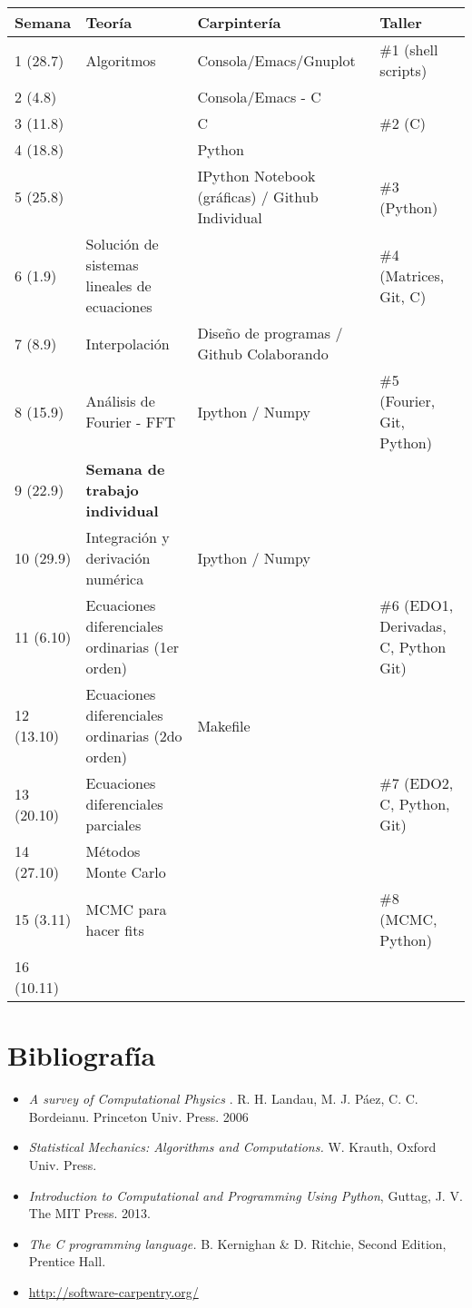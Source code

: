 \documentclass[11pt]{article}
\begin{document}
\begin{center}
\begin{tabular}{|p{1.8cm}|p{6cm}|p{4.0cm}|p{4.5cm}|}
\hline
Semana & Teor\'ia & Carpinter\'ia & Taller \\\hline
1 (28.7) & Algoritmos	&Consola/Emacs/Gnuplot & \#1 (shell scripts)\\\hline
2 (4.8)& 	& Consola/Emacs - C  & \\\hline
3 (11.8)& 	&C  & \#2 (C)\\\hline
4 (18.8)& 	&Python &  \\\hline
5 (25.8)& 	&IPython Notebook (gr\'aficas) / Github Individual & \#3
(Python) \\\hline
6 (1.9)&      Soluci\'on de sistemas lineales de ecuaciones &  & \#4
(Matrices, Git, C)\\\hline
7 (8.9)&  Interpolaci\'on & Dise\~no de programas / Github Colaborando & \\ \hline
8 (15.9)& An\'alisis de Fourier - FFT &  Ipython / Numpy& \#5 (Fourier, Git, Python)\\\hline
9 (22.9) & {\bf Semana de trabajo individual} & &\\\hline 
10 (29.9) & Integraci\'on y derivaci\'on num\'erica & Ipython / Numpy & \\\hline
11 (6.10) & Ecuaciones diferenciales ordinarias (1er orden)& &  \#6
(EDO1, Derivadas, C, Python Git)\\\hline
12 (13.10)& Ecuaciones diferenciales ordinarias (2do orden)&  Makefile &   \\\hline 
13 (20.10) & Ecuaciones diferenciales parciales & & \#7 (EDO2, C, Python, Git)\\\hline
14 (27.10) & M\'etodos Monte Carlo &   & \\\hline
15 (3.11) & MCMC para hacer fits &    & \#8 (MCMC, Python)\\\hline
16 (10.11) &  &    & \\\hline
\hline
\end{tabular}
\end{center}


\section*{Bibliograf\'ia}
\begin{itemize}
\item
\textit{A survey of Computational Physics}
. R. H. Landau, M. J. P\'aez, C. C. Bordeianu. Princeton Univ. Press. 2006
\item 
\textit{Statistical Mechanics: Algorithms and Computations.}
W. Krauth, Oxford Univ. Press. 
\item 
\textit{Introduction to Computational and Programming Using Python},
Guttag, J. V. The MIT Press. 2013.
\item 
\textit{The C programming language.}
 B. Kernighan \& D. Ritchie, Second Edition, Prentice Hall.
\item\url{http://software-carpentry.org/}
\end{itemize}

 
\end{document}
